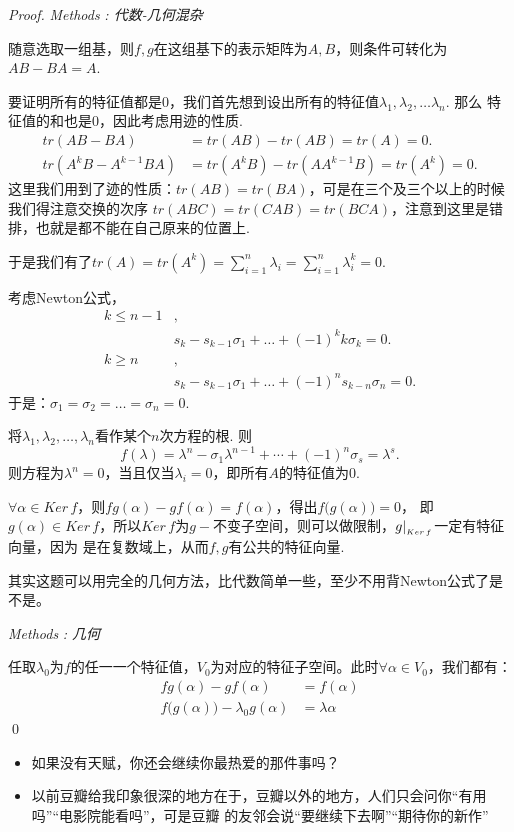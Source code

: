 \begin{proof}
	\emph{Methods\,\,\uppercase\expandafter{}: 代数-几何混杂}

	随意选取一组基，则$f,g$在这组基下的表示矩阵为$A,B$，则条件可转化为$AB-BA=A$.

	要证明所有的特征值都是0，我们首先想到设出所有的特征值$\lambda_1,\lambda_2,\dots\lambda_n$. 那么
	特征值的和也是$0$，因此考虑用迹的性质.
	\begin{align*}
		tr(AB-BA) &= tr(AB) - tr(AB) = tr(A) = 0. \\
		tr(A^kB-A^{k-1}BA) &= tr(A^kB) - tr(A A^{k-1} B) = tr(A^k) = 0.
	\end{align*}
	这里我们用到了迹的性质：$tr(AB) = tr(BA)$，可是在三个及三个以上的时候我们得注意交换的次序
	$tr(ABC) = tr(CAB) = tr(BCA)$，注意到这里是错排，也就是都不能在自己原来的位置上.

	于是我们有了$tr(A)=tr(A^k)=\sum_{i=1}^n \lambda_i = \sum_{i=1}^n \lambda_i^k=0$.

	考虑Newton公式，
	\begin{align*}
		k \leq n-1&,\\
		& s_k - s_{k-1} \sigma_1 + \dots + (-1)^k k\sigma_k = 0. \\
		k \geq n \quad\,\,\,\, &,\\
		& s_k - s_{k-1} \sigma_1 + \dots + (-1)^n s_{k-n} \sigma_n = 0.
	\end{align*}
	于是：$\sigma_1=\sigma_2=\dots=\sigma_n=0$.
	
	将$\lambda_1,\lambda_2,\dots,\lambda_n$看作某个$n$次方程的根. 则
	$$
		f(\lambda) = \lambda^n - \sigma_1 \lambda^{n-1} + \cdots + (-1)^{n}\sigma_s = \lambda^s.
	$$
	则方程为$\lambda^n=0$，当且仅当$\lambda_i=0$，即所有$A$的特征值为$0$.

	$\forall \alpha \in Ker \, f$，则$fg(\alpha) - gf(\alpha) = f (\alpha)$，得出$f\bigl( g(\alpha) \bigr) = 0$，
	即$g(\alpha) \in Ker \, f$，所以$Ker \, f$为$g-$不变子空间，则可以做限制，$g |_{_{Ker\,f}}$一定有特征向量，因为
	是在复数域上，从而$f,g$有公共的特征向量. 

	其实这题可以用完全的几何方法，比代数简单一些，至少不用背Newton公式了是不是。

	\emph{Methods\,\,\uppercase\expandafter{}: 几何}

	任取$\lambda_0$为$f$的任一一个特征值，$V_0$为对应的特征子空间。此时$\forall \alpha \in 
	V_0$，我们都有：
	\begin{align*}
		fg (\alpha) - gf (\alpha) &= f(\alpha) \\
		f \bigl( g(\alpha) \bigr) - \lambda_0 g(\alpha) &= \lambda \alpha
	\end{align*}
	\qed{}
\end{proof}

\begin{itemize}
	\item 如果没有天赋，你还会继续你最热爱的那件事吗？
	\item 以前豆瓣给我印象很深的地方在于，豆瓣以外的地方，人们只会问你“有用吗”“电影院能看吗”，可是豆瓣
		  的友邻会说“要继续下去啊”“期待你的新作”
\end{itemize}